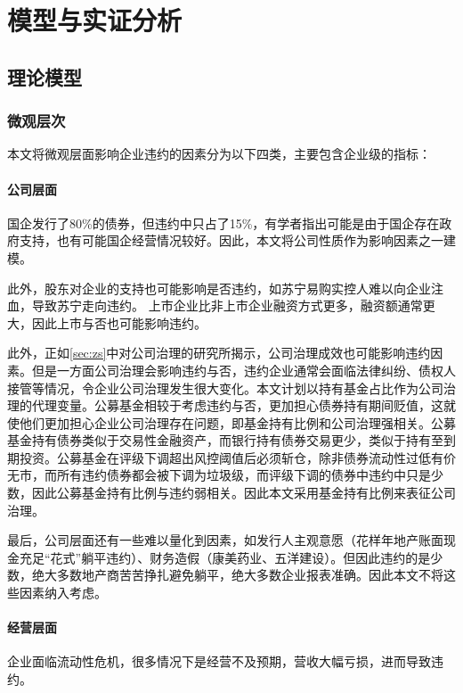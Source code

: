 
\chapter{模型与实证分析}

\section{理论模型}
\subsection{微观层次}
本文将微观层面影响企业违约的因素分为以下四类，主要包含企业级的指标：
\subsubsection{公司层面}

国企发行了80\%的债券，但违约中只占了15\%，有学者指出可能是由于国企存在政府支持\autocite{mo2021china}，也有可能国企经营情况较好。因此，本文将公司性质作为影响因素之一建模。

此外，股东对企业的支持也可能影响是否违约，如苏宁易购实控人难以向企业注血，导致苏宁走向违约。
上市企业比非上市企业融资方式更多，融资额通常更大，因此上市与否也可能影响违约。

此外，正如\ref{sec:zs}中对公司治理的研究所揭示，公司治理成效也可能影响违约因素。但是一方面公司治理会影响违约与否，违约企业通常会面临法律纠纷、债权人接管等情况，令企业公司治理发生很大变化。本文计划以持有基金占比作为公司治理的代理变量。公募基金相较于考虑违约与否，更加担心债券持有期间贬值，这就使他们更加担心企业公司治理存在问题，即基金持有比例和公司治理强相关。公募基金持有债券类似于交易性金融资产，而银行持有债券交易更少，类似于持有至到期投资。公募基金在评级下调超出风控阈值后必须斩仓，除非债券流动性过低有价无市，而所有违约债券都会被下调为垃圾级，而评级下调的债券中违约中只是少数，因此公募基金持有比例与违约弱相关。因此本文采用基金持有比例来表征公司治理。

最后，公司层面还有一些难以量化到因素，如发行人主观意愿（花样年地产账面现金充足“花式”躺平违约）、财务造假（康美药业、五洋建设）。但因此违约的是少数，绝大多数地产商苦苦挣扎避免躺平，绝大多数企业报表准确。因此本文不将这些因素纳入考虑。
\subsubsection{经营层面}
企业面临流动性危机，很多情况下是经营不及预期，营收大幅亏损，进而导致违约。

